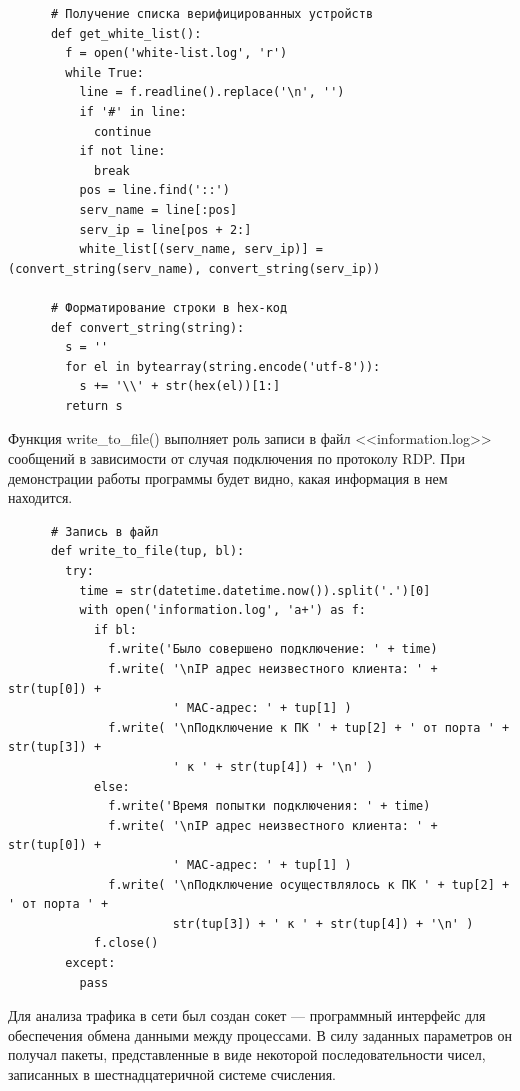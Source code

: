 \documentclass[bachelor, och, coursework]{SCWorks}
\begin{document}
    \begin{verbatim}
      # Получение списка верифицированных устройств
      def get_white_list():
        f = open('white-list.log', 'r')
        while True:
          line = f.readline().replace('\n', '')
          if '#' in line:
            continue
          if not line:
            break
          pos = line.find('::')
          serv_name = line[:pos]
          serv_ip = line[pos + 2:]
          white_list[(serv_name, serv_ip)] = (convert_string(serv_name), convert_string(serv_ip))

      # Форматирование строки в hex-код
      def convert_string(string):
        s = ''
        for el in bytearray(string.encode('utf-8')):
          s += '\\' + str(hex(el))[1:]
        return s
    \end{verbatim}

    Функция write_to_file() выполняет роль записи в файл <<information.log>> сообщений в зависимости от случая подключения по протоколу RDP. 
    При демонстрации работы программы будет видно, какая информация в нем находится.
    
    \begin{verbatim}
      # Запись в файл
      def write_to_file(tup, bl):
        try:
          time = str(datetime.datetime.now()).split('.')[0]
          with open('information.log', 'a+') as f:
            if bl:
              f.write('Было совершено подключение: ' + time)
              f.write( '\nIP адрес неизвестного клиента: ' + str(tup[0]) + 
                       ' MAC-адрес: ' + tup[1] )
              f.write( '\nПодключение к ПК ' + tup[2] + ' от порта ' + str(tup[3]) + 
                       ' к ' + str(tup[4]) + '\n' )
            else:
              f.write('Время попытки подключения: ' + time)
              f.write( '\nIP адрес неизвестного клиента: ' + str(tup[0]) + 
                       ' MAC-адрес: ' + tup[1] )
              f.write( '\nПодключение осуществлялось к ПК ' + tup[2] + ' от порта ' + 
                       str(tup[3]) + ' к ' + str(tup[4]) + '\n' )
            f.close()
        except:
          pass
    \end{verbatim}

    Для анализа трафика в сети был создан сокет --- программный интерфейс для обеспечения обмена данными между процессами. В силу заданных параметров он
    получал пакеты, представленные в виде некоторой последовательности чисел, записанных в шестнадцатеричной системе счисления.
    
\end{document}
